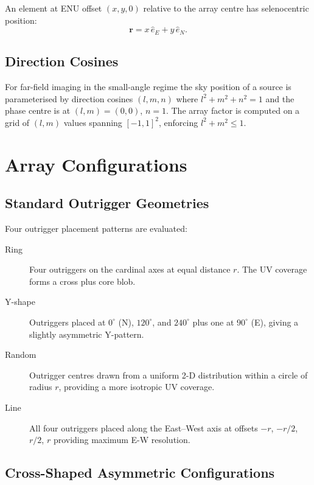 \documentclass[12pt,a4paper]{article}
\begin{document}
An element at ENU offset $(x, y, 0)$ relative to the array centre has
selenocentric position:
\begin{equation}
  \mathbf{r} = x\,\hat{e}_E + y\,\hat{e}_N.
\end{equation}

\subsection{Direction Cosines}

For far-field imaging in the small-angle regime the sky position of a source is
parameterised by direction cosines $(l, m, n)$ where
$l^2 + m^2 + n^2 = 1$ and the phase centre is at $(l,m) = (0,0)$, $n = 1$.
The array factor is computed on a grid of $(l, m)$ values spanning
$[-1, 1]^2$, enforcing $l^2 + m^2 \le 1$.

\section{Array Configurations}
\label{sec:configs}

\subsection{Standard Outrigger Geometries}

Four outrigger placement patterns are evaluated:

\begin{description}
  \item[Ring] Four outriggers on the cardinal axes at equal distance $r$.
    The UV coverage forms a cross plus core blob.
  \item[Y-shape] Outriggers placed at $0^\circ$ (N), $120^\circ$, and
    $240^\circ$ plus one at $90^\circ$ (E), giving a slightly asymmetric
    Y-pattern.
  \item[Random] Outrigger centres drawn from a uniform 2-D distribution
    within a circle of radius $r$, providing a more isotropic UV coverage.
  \item[Line] All four outriggers placed along the East--West axis at
    offsets $-r$, $-r/2$, $r/2$, $r$ providing maximum E-W resolution.
\end{description}

\subsection{Cross-Shaped Asymmetric Configurations}
\label{sec:cross}
\end{document}

